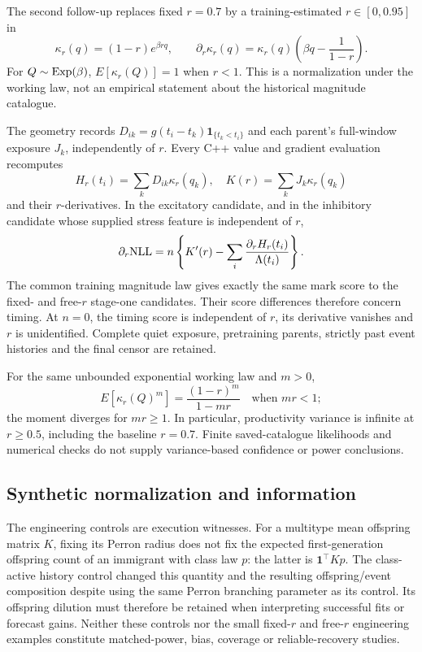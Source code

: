 The second follow-up replaces fixed \(r=0.7\) by a training-estimated
\(r\in[0,0.95]\) in
\begin{equation}
 \kappa_r(q)=(1-r)e^{\beta rq},\qquad
 \partial_r\kappa_r(q)=\kappa_r(q)
            \left(\beta q-\frac{1}{1-r}\right).
 \label{a2:productivity}
\end{equation}
For \(Q\sim{\rm Exp}(\beta)\), \(E[\kappa_r(Q)]=1\) when \(r<1\).
This is a normalization under the working law, not an empirical statement
about the historical magnitude catalogue.

The geometry records \(D_{ik}=g(t_i-t_k)\mathbf 1_{\{t_k<t_i\}}\)
and each parent's full-window exposure \(J_k\), independently of \(r\).
Every C++ value and gradient evaluation recomputes
\[
 H_r(t_i)=\sum_k D_{ik}\kappa_r(q_k),\quad
 K(r)=\sum_kJ_k\kappa_r(q_k)
\]
and their \(r\)-derivatives. In the excitatory candidate, and in the
inhibitory candidate whose supplied stress feature is independent of \(r\),
\begin{equation}
 \partial_r{\rm NLL}
 =n\left\{K'(r)-\sum_i\frac{\partial_rH_r(t_i)}{\Lambda(t_i)}\right\}.
 \label{a2:r-gradient}
\end{equation}
The common training magnitude law gives exactly the same mark score to
the fixed- and free-\(r\) stage-one candidates. Their score differences
therefore concern timing. At \(n=0\), the timing score is independent of
\(r\), its derivative vanishes and \(r\) is unidentified. Complete quiet
exposure, pretraining parents,
strictly past event histories and the final censor are retained.

For the same unbounded exponential working law and \(m>0\),
\[
 E[\kappa_r(Q)^m]=\frac{(1-r)^m}{1-mr}
 \quad\text{when }mr<1;
\]
the moment diverges for \(mr\geq1\). In particular, productivity variance
is infinite at \(r\geq 0.5\), including the baseline \(r=0.7\).
Finite saved-catalogue likelihoods and numerical checks do not supply
variance-based confidence or power conclusions.

\subsection{Synthetic normalization and information}

The engineering controls are execution witnesses. For a multitype mean
offspring matrix \(K\), fixing its Perron radius does not fix the expected
first-generation offspring count of an immigrant with class law \(p\):
the latter is \(\mathbf 1^\top Kp\). The class-active history control
changed this quantity and the resulting offspring/event composition despite
using the same Perron branching parameter as its control. Its offspring
dilution must therefore be retained when interpreting successful fits or
forecast gains. Neither these controls nor the small fixed-\(r\) and
free-\(r\) engineering examples constitute matched-power, bias, coverage or
reliable-recovery studies.

